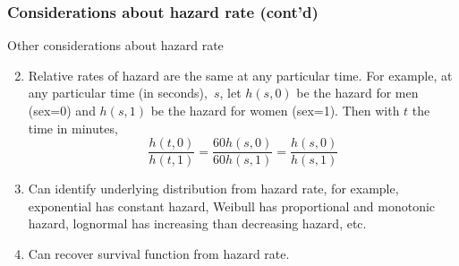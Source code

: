 \documentclass{beamer}
\theoremstyle{definition}
\begin{document}
\begin{frame}\frametitle{Considerations about hazard rate (cont'd)}
\begin{block}{Other considerations about hazard rate}
\begin{enumerate}
  \setcounter{enumi}{1}
\item Relative rates of hazard are the same at any particular time.  For example, at any particular time (in seconds),~$s$, let $h(s,0)$ be the hazard for men (sex=0) and $h(s,1)$ be the hazard for women (sex=1). Then with $t$ the time in minutes,
    \[ \dfrac{h(t,0)}{h(t,1)} =  \dfrac{60 h(s,0)}{60 h(s,1)} = \dfrac{ h(s,0)}{ h(s,1)}
    \]
\item Can identify underlying distribution from hazard rate, for example, exponential has constant hazard, Weibull has proportional and monotonic hazard, lognormal has increasing than decreasing hazard, etc.
\item Can recover survival function from hazard rate.
\end{enumerate}
\end{block}
\end{frame}
\end{document}
